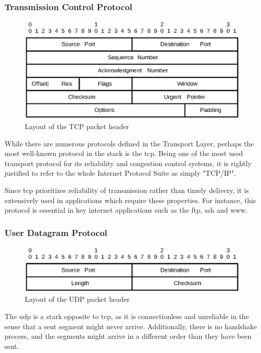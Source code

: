 \subsubsection{Transmission Control Protocol}
\begin{figure}
\includegraphics[width=\linewidth]{background/tcp.eps}
\caption{Layout of the TCP packet header}
\label{fig:tcp_header}
\end{figure}

While there are numerous protocols defined in the Transport Layer, perhaps the
most well-known protocol in the stack is the \gls{tcp}.
Being one of the most used transport protocol for its reliability and congestion
control systems, it is rightly justified to refer to the whole Internet Protocol
Suite as simply "TCP/IP".

Since \gls{tcp} prioritizes reliability of transmission rather than timely
delivery, it is extensively used in applications which require these
properties. For instance, this protocol is essential in key internet applications
 such as the \gls{ftp}, \gls{ssh} and \gls{www}.


\subsubsection{User Datagram Protocol}
\begin{figure}
\includegraphics[width=\linewidth]{background/udp.eps}
\caption{Layout of the UDP packet header}
\label{fig:udp_header}
\end{figure}

The \gls{udp} is a stark opposite to \gls{tcp}, as it is connectionless and
unreliable in the sense that a sent segment might never arrive.
Additionally, there is no handshake process, and the segments might arrive in
a different order than they have been sent.

